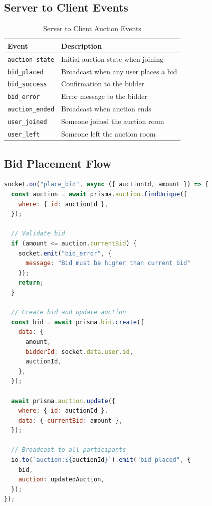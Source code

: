 \documentclass[12pt,a4paper]{report}
\begin{document}
\subsection{Server to Client Events}

\begin{table}[H]
\centering
\begin{tabularx}{\textwidth}{|l|X|}
\hline
\textbf{Event} & \textbf{Description} \\
\hline
\texttt{auction\_state} & Initial auction state when joining \\
\hline
\texttt{bid\_placed} & Broadcast when any user places a bid \\
\hline
\texttt{bid\_success} & Confirmation to the bidder \\
\hline
\texttt{bid\_error} & Error message to the bidder \\
\hline
\texttt{auction\_ended} & Broadcast when auction ends \\
\hline
\texttt{user\_joined} & Someone joined the auction room \\
\hline
\texttt{user\_left} & Someone left the auction room \\
\hline
\end{tabularx}
\caption{Server to Client Auction Events}
\end{table}

\subsection{Bid Placement Flow}

\begin{lstlisting}[language=JavaScript, caption=Bid Placement Handler]
socket.on("place_bid", async ({ auctionId, amount }) => {
  const auction = await prisma.auction.findUnique({
    where: { id: auctionId },
  });

  // Validate bid
  if (amount <= auction.currentBid) {
    socket.emit("bid_error", { 
      message: "Bid must be higher than current bid" 
    });
    return;
  }

  // Create bid and update auction
  const bid = await prisma.bid.create({
    data: {
      amount,
      bidderId: socket.data.user.id,
      auctionId,
    },
  });

  await prisma.auction.update({
    where: { id: auctionId },
    data: { currentBid: amount },
  });

  // Broadcast to all participants
  io.to(`auction:${auctionId}`).emit("bid_placed", {
    bid,
    auction: updatedAuction,
  });
});
\end{lstlisting}
\end{document}

